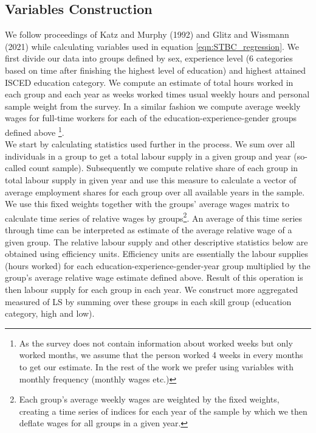 \documentclass{article}
\begin{document}
\subsection{Variables Construction} \label{KM_vars}
We follow proceedings of Katz and Murphy (1992) and Glitz and Wissmann (2021) while calculating variables used in equation \ref{eqn:STBC_regression}. We first divide our data into groups defined by sex, experience level (6 categories based on time after finishing the highest level of education) and highest attained ISCED education category.
We compute an estimate of total hours worked in each group and each year as weeks worked times usual weekly hours and personal sample weight from the survey. In a similar fashion we compute average weekly wages for full-time workers for each of the education-experience-gender groups defined above \footnote{As the survey does not contain information about worked weeks but only worked months, we assume that the person worked 4 weeks in every months to get our estimate. In the rest of the work we prefer using variables with monthly frequency (monthly wages etc.)}.
\\
We start by calculating statistics used further in the process. We sum over all individuals in a group to get a total labour supply in a given group and year (so-called count sample). Subsequently we compute relative share of each group in total labour supply in given year and use this measure to calculate a vector of average employment shares for each group over all available years in the sample. We use this fixed weights together with the groups' average wages matrix to calculate time series of relative wages by groups\footnote{Each group's average weekly wages are weighted by the fixed weights, creating a time series of indices for each year of the sample by which we then deflate wages for all groups in a given year.}. An average of this time series through time can be interpreted as estimate of the average relative wage of a given group.%
The relative labour supply and other descriptive statistics below are obtained using efficiency units. Efficiency units are essentially the labour supplies (hours worked) for each education-experience-gender-year group multiplied by the group's average relative wage estimate defined above. Result of this operation is then labour supply for each group in each year. We construct more aggregated measured of LS by summing over these groups in each skill group (education category, high and low).
\end{document}
